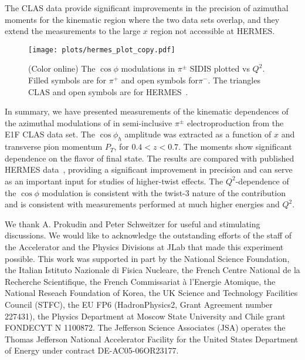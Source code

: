 \documentclass[aps,prl,twocolumn,showpacs,superscriptaddress,groupedaddress]{revtex4}  %
\newcommand{\xbj}{x}
\begin{document}
The CLAS data provide
significant improvements in the precision of azimuthal moments  for the kinematic region where the two data
sets overlap, and they extend the measurements to the large $\xbj$ region not accessible at HERMES.
\begin{figure}[h]
\begin{center}
\texttt{[image: plots/hermes\_plot\_copy.pdf]}
\end{center}
\caption{(Color online) The $\cos\phi$ modulations in $\pi^\pm$ SIDIS plotted vs $Q^2$. Filled symbols are for $\pi^+$ and open symbols for$\pi^-$.
The triangles CLAS and open symbols are for HERMES~\cite{Airapetian:2012yg}.}
\label{fig:clas-hermes}
\end{figure}


 

In summary, we have presented measurements of the kinematic dependences
 of the azimuthal modulations of  in semi-inclusive $\pi ^\pm$ electroproduction from the E1F CLAS data set. 
The $\cos \phi_h$ amplitude was extracted as a function of $\xbj$ and transverse pion 
momentum $P_T$, for  $0.4<z<0.7$.
The  moments show significant  dependence on the flavor of final state. The results are compared with published HERMES data~\cite{Airapetian:2012yg}, 
providing  a significant improvement in precision and can serve as an important input for studies of higher-twist effects.
The  $Q^2$-dependence of the $\cos\phi$ modulation is consistent with 
the twist-3 nature of the contribution and is consistent with measurements performed at much higher energies and $Q^2$.

We thank A. Prokudin and Peter Schweitzer for useful and stimulating discussions.
We would like to acknowledge the outstanding efforts of the staff of the 
Accelerator and the Physics Divisions at JLab that made this experiment possible.
This work was supported in part by 
the National Science Foundation, 
the Italian Istituto Nazionale di Fisica Nucleare, 
the French Centre National de la Recherche Scientifique,
the French Commissariat \`{a} l'Energie Atomique, 
the National Reseach Foundation of Korea,
the UK Science and Technology Facilities Council (STFC),
the EU FP6 (HadronPhysics2, Grant Agreement number 227431),
the Physics Department at Moscow State University
and Chile grant FONDECYT N 1100872.
The Jefferson Science Associates (JSA) operates the Thomas Jefferson National Accelerator Facility for the United States Department of Energy under contract DE-AC05-06OR23177.
\end{document}
